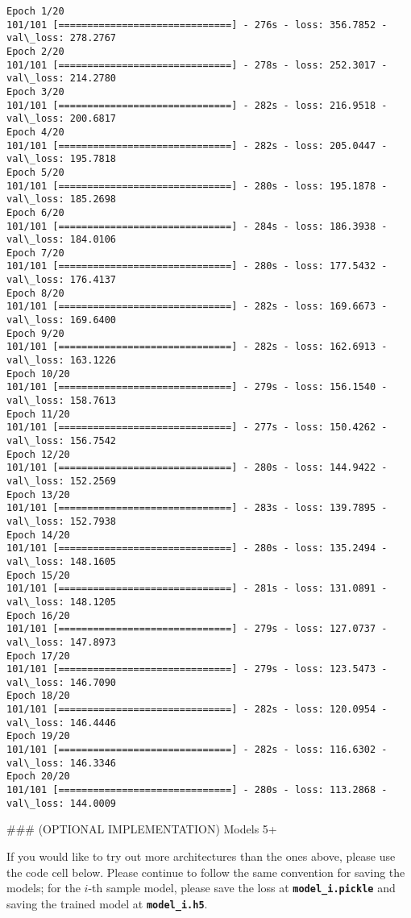 \documentclass[11pt]{article}
\begin{document}
    \begin{Verbatim}[commandchars=\\\{\}]
Epoch 1/20
101/101 [==============================] - 276s - loss: 356.7852 - val\_loss: 278.2767
Epoch 2/20
101/101 [==============================] - 278s - loss: 252.3017 - val\_loss: 214.2780
Epoch 3/20
101/101 [==============================] - 282s - loss: 216.9518 - val\_loss: 200.6817
Epoch 4/20
101/101 [==============================] - 282s - loss: 205.0447 - val\_loss: 195.7818
Epoch 5/20
101/101 [==============================] - 280s - loss: 195.1878 - val\_loss: 185.2698
Epoch 6/20
101/101 [==============================] - 284s - loss: 186.3938 - val\_loss: 184.0106
Epoch 7/20
101/101 [==============================] - 280s - loss: 177.5432 - val\_loss: 176.4137
Epoch 8/20
101/101 [==============================] - 282s - loss: 169.6673 - val\_loss: 169.6400
Epoch 9/20
101/101 [==============================] - 282s - loss: 162.6913 - val\_loss: 163.1226
Epoch 10/20
101/101 [==============================] - 279s - loss: 156.1540 - val\_loss: 158.7613
Epoch 11/20
101/101 [==============================] - 277s - loss: 150.4262 - val\_loss: 156.7542
Epoch 12/20
101/101 [==============================] - 280s - loss: 144.9422 - val\_loss: 152.2569
Epoch 13/20
101/101 [==============================] - 283s - loss: 139.7895 - val\_loss: 152.7938
Epoch 14/20
101/101 [==============================] - 280s - loss: 135.2494 - val\_loss: 148.1605
Epoch 15/20
101/101 [==============================] - 281s - loss: 131.0891 - val\_loss: 148.1205
Epoch 16/20
101/101 [==============================] - 279s - loss: 127.0737 - val\_loss: 147.8973
Epoch 17/20
101/101 [==============================] - 279s - loss: 123.5473 - val\_loss: 146.7090
Epoch 18/20
101/101 [==============================] - 282s - loss: 120.0954 - val\_loss: 146.4446
Epoch 19/20
101/101 [==============================] - 282s - loss: 116.6302 - val\_loss: 146.3346
Epoch 20/20
101/101 [==============================] - 280s - loss: 113.2868 - val\_loss: 144.0009

    \end{Verbatim}

     \#\#\# (OPTIONAL IMPLEMENTATION) Models 5+

If you would like to try out more architectures than the ones above,
please use the code cell below. Please continue to follow the same
convention for saving the models; for the \(i\)-th sample model, please
save the loss at \textbf{\texttt{model\_i.pickle}} and saving the
trained model at \textbf{\texttt{model\_i.h5}}.
\end{document}
